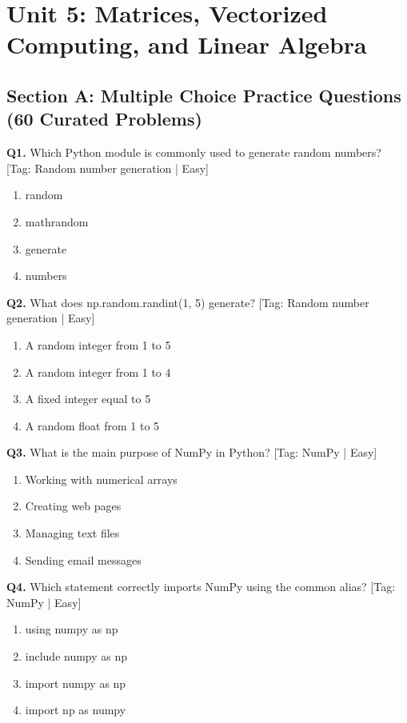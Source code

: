\chapter{Unit 5: Matrices, Vectorized Computing, and Linear Algebra}

\section{Section A: Multiple Choice Practice Questions (60 Curated Problems)}

\noindent\textbf{Q1.} Which Python module is commonly used to generate random numbers? \hfill [Tag: Random number generation | Easy]
\begin{enumerate}[label=(\alph*),topsep=2pt,itemsep=1pt,partopsep=0pt,parsep=0pt]
    \item {random}
    \item {mathrandom}
    \item {generate}
    \item {numbers}
\end{enumerate}
\vspace{2mm}
\noindent\textbf{Q2.} What does np.random.randint(1, 5) generate? \hfill [Tag: Random number generation | Easy]
\begin{enumerate}[label=(\alph*),topsep=2pt,itemsep=1pt,partopsep=0pt,parsep=0pt]
    \item {A random integer from 1 to 5}
    \item {A random integer from 1 to 4}
    \item {A fixed integer equal to 5}
    \item {A random float from 1 to 5}
\end{enumerate}
\vspace{2mm}
\noindent\textbf{Q3.} What is the main purpose of NumPy in Python? \hfill [Tag: NumPy | Easy]
\begin{enumerate}[label=(\alph*),topsep=2pt,itemsep=1pt,partopsep=0pt,parsep=0pt]
    \item {Working with numerical arrays}
    \item {Creating web pages}
    \item {Managing text files}
    \item {Sending email messages}
\end{enumerate}
\vspace{2mm}
\noindent\textbf{Q4.} Which statement correctly imports NumPy using the common alias? \hfill [Tag: NumPy | Easy]
\begin{enumerate}[label=(\alph*),topsep=2pt,itemsep=1pt,partopsep=0pt,parsep=0pt]
    \item {using numpy as np}
    \item {include numpy as np}
    \item {import numpy as np}
    \item {import np as numpy}
\end{enumerate}
